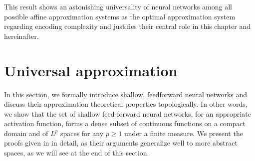 \documentclass[11pt,a4paper,twoside,openany]{report}
\numberwithin{equation}{section}
\theoremstyle{plain} %
\theoremstyle{definition} %
\theoremstyle{remark} %
\let\parencite\authnumparencite
\begin{document}
This result shows an astonishing universality of neural networks among all possible affine approximation systems  as the optimal approximation system regarding encoding complexity and justifies their central role in this chapter and hereinafter. 

\section{Universal approximation}
In this section, we formally introduce shallow, feedforward neural networks and discuss their approximation theoretical properties topologically. In other words, we show that the set of shallow feed-forward neural networks, for an appropriate activation function, forms a dense subset of continuous functions on a compact domain and of \(L^p\) spaces for any \(p\geq 1\) under a finite measure. We present the proofs given in \parencite{Hornik1991} in detail, as their arguments generalize well to more abstract spaces, as we will see at the end of this section.
\end{document}
